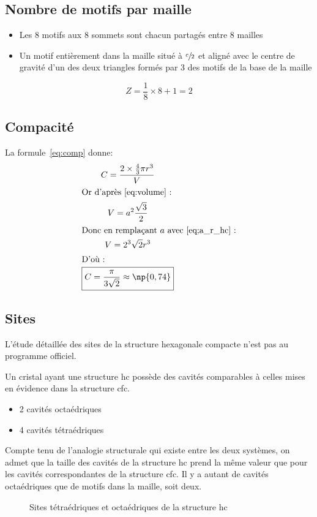 \subsection{Nombre de motifs par maille}
\begin{itemize}
    \item Les 8 motifs aux 8 sommets sont chacun partagés entre
        8 mailles
    \item Un motif entièrement dans la maille situé à
        $\sfrac{c}{2}$ et aligné avec le centre de gravité d'un
        des deux triangles formés par 3 des motifs de la base de
        la maille
\end{itemize}
\begin{equation}
    Z = \frac{1}{8} \times 8 + 1 = 2
\end{equation}

\subsection{Compacité}
La formule~\ref{eq:comp} donne:
\begin{gather}
    C = \frac{2 \times \frac{4}{3}\pi r^3}{V}\\
    \intertext{Or d'après~\ref{eq:volume} :}
    V=a^2 \frac{\sqrt{3}}{2}\\
    \intertext{Donc en remplaçant $a$ avec~\ref{eq;a_r_hc} :}
    V=2^3\sqrt{2}r^3 \label{eq:V_hc}\\
    \intertext{D'où :}
    \boxed{C = \frac{\pi}{3\sqrt{2}} \approx \np{0,74}}
    \label{eq:comp_hc}
\end{gather}

\subsection{Sites}
\begin{rem}
    L'étude détaillée des sites de la structure hexagonale
    compacte n'est pas au programme officiel.
\end{rem}
Un cristal ayant une structure hc possède des cavités comparables
à celles mises en évidence dans la structure cfc.
\begin{itemize}
    \item 2 cavités octaédriques
    \item 4 cavités tétraédriques
\end{itemize}
Compte tenu de l’analogie structurale qui existe entre les deux
systèmes, on admet que la taille des cavités de la structure
hc prend la même valeur que pour les cavités correspondantes
de la structure cfc. Il y a autant de cavités octaédriques que
de motifs dans la maille, soit deux.
\begin{figure}
    \centering
    
    \caption{Sites tétraédriques et octaédriques
        de la structure hc}
\end{figure}


